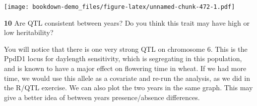 \documentclass[
]{book}
\makeatletter
\newenvironment{Shaded}{\begin{snugshade}}{\end{snugshade}}
\newcommand{\AttributeTok}[1]{\textcolor[rgb]{0.77,0.63,0.00}{#1}}
\newcommand{\CommentTok}[1]{\textcolor[rgb]{0.56,0.35,0.01}{\textit{#1}}}
\newcommand{\DecValTok}[1]{\textcolor[rgb]{0.00,0.00,0.81}{#1}}
\newcommand{\FloatTok}[1]{\textcolor[rgb]{0.00,0.00,0.81}{#1}}
\newcommand{\FunctionTok}[1]{\textcolor[rgb]{0.00,0.00,0.00}{#1}}
\newcommand{\NormalTok}[1]{#1}
\newcommand{\OtherTok}[1]{\textcolor[rgb]{0.56,0.35,0.01}{#1}}
\newcommand{\SpecialCharTok}[1]{\textcolor[rgb]{0.00,0.00,0.00}{#1}}
\newcommand{\StringTok}[1]{\textcolor[rgb]{0.31,0.60,0.02}{#1}}
\newenvironment{kframe}{%
\medskip{}
\setlength{\fboxsep}{.8em}
 \def\at@end@of@kframe{}%
 \ifinner\ifhmode%
  \def\at@end@of@kframe{\end{minipage}}%
  \begin{minipage}{\columnwidth}%
 \fi\fi%
 \def\FrameCommand##1{\hskip\@totalleftmargin \hskip-\fboxsep
 \colorbox{shadecolor}{##1}\hskip-\fboxsep
     \hskip-\linewidth \hskip-\@totalleftmargin \hskip\columnwidth}%
 \MakeFramed {\advance\hsize-\width
   \@totalleftmargin\z@ \linewidth\hsize
   \@setminipage}}%
 {\par\unskip\endMakeFramed%
 \at@end@of@kframe}
\newenvironment{rmdblock}[1]
  {
  \begin{itemize}
  \renewcommand{\labelitemi}{
    \raisebox{-.7\height}[0pt][0pt]{
      {\setkeys{Gin}{width=3em,keepaspectratio}\texttt{[image: images/\#1]}}
    }
  }
  \setlength{\fboxsep}{1em}
  \begin{kframe}
  \item
  }
  {
  \end{kframe}
  \end{itemize}
  }
\newenvironment{rmdquiz}
  {\begin{rmdblock}{quiz}}
  {\end{rmdblock}}
\makeatother
\begin{document}
\begin{Shaded}
\end{Shaded}

\texttt{[image: bookdown-demo\_files/figure-latex/unnamed-chunk-472-1.pdf]}
\begin{rmdquiz}
\textbf{10}
Are QTL consistent between years? Do you think this trait may have high or low heritability?
\end{rmdquiz}

You will notice that there is one very strong QTL on chromosome 6. This is the PpdD1 locus for daylength sensitivity, which is segregating in this population, and is known to have a major effect on flowering time in wheat. If we had more time, we would use this allele as a covariate and re-run the analysis, as we did in the R/QTL exercise. We can also plot the two years in the same graph. This may give a better idea of between years presence/absence differences.
\end{document}
